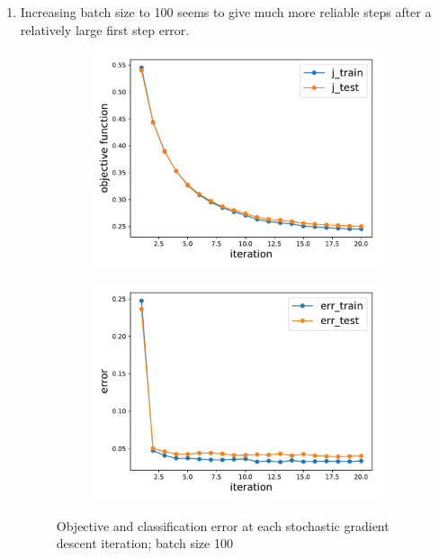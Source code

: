 \documentclass[11pt,letterpaper]{article}
\numberwithin{equation}{section}
\numberwithin{figure}{section}
\begin{document}
\begin{enumerate}
\begin{enumerate}
		\item Increasing batch size to 100 seems to give much more reliable steps after a relatively large first step error.


		\begin{figure}[H]
			\centering
			\begin{subfigure}{.45\textwidth}
				\centering
				\includegraphics[width=\textwidth]{figures/mnist_sgd_100_obj.pdf}
			\end{subfigure}
			\begin{subfigure}{.45\textwidth}
				\centering
				\includegraphics[width=\textwidth]{figures/mnist_sgd_100_err.pdf}
			\end{subfigure}
			\caption{Objective and classification error at each stochastic gradient descent iteration; batch size 100}
		\end{figure}


\end{enumerate}
\end{enumerate}
\end{document}
